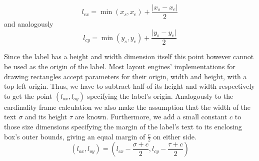 \begin{equation}
    l_{cx} = \min{(x_s, x_e)} + \frac{\vert x_s - x_e \vert}{2}
\end{equation}
and analogously
\begin{equation}
    l_{cy} = \min{(y_s, y_e)} + \frac{\vert y_s - y_e \vert}{2}
\end{equation}

Since the label has a height and width dimension itself this point however cannot be used as the origin of the label. Most layout engines' implementations for drawing rectangles accept parameters for their origin, width and height, with a top-left origin. Thus, we have to subtract half of its height and width respectively to get the point $(l_{ox}, l_{oy})$ specifying the label's origin. Analogously to the cardinality frame calculation we also make the assumption that the width of the text $\sigma$ and its height $\tau$ are known. Furthermore, we add a small constant $c$ to those size dimensions specifying the margin of the label's text to its enclosing box's outer bounds, giving an equal margin of $\frac{c}{2}$ on either side.
\begin{equation}
    (l_{ox}, l_{oy}) = (l_{cx} - \frac{\sigma + c}{2}, l_{cy} - \frac{\tau + c}{2})
\end{equation}





